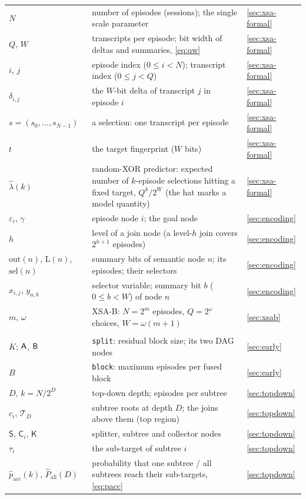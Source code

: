 \documentclass[11pt,a4paper]{article}
\newcommand{\XSAB}{\textsf{XSA-B}}
\newcommand{\dfam}[1]{\texttt{#1}}
\newcommand{\outb}{\mathrm{out}}
\newcommand{\selv}{\mathrm{sel}}
\newcommand{\lv}{\mathrm{L}}
\newcommand{\pacc}{\widehat{p}_{\mathrm{acc}}}
\newcommand{\Pall}{\widehat{P}_{\mathrm{all}}}
\newcommand{\nS}{\mathsf{S}}\newcommand{\nK}{\mathsf{K}}\newcommand{\nC}{\mathsf{C}}
\begin{document}
\begin{longtable}{@{}p{}p{}p{}@{}}
$N$ & number of episodes (sessions); the single scale parameter & \ref{sec:xsa-formal} \\
$Q$, $W$ & transcripts per episode; bit width of deltas and summaries, \eqref{eq:qw} & \ref{sec:xsa-formal} \\
$i$, $j$ & episode index ($0\le i<N$); transcript index ($0\le j<Q$) & \ref{sec:xsa-formal} \\
$\delta_{i,j}$ & the $W$-bit delta of transcript $j$ in episode $i$ & \ref{sec:xsa-formal} \\
$s=(s_0,\dots,s_{N-1})$ & a selection: one transcript per episode & \ref{sec:xsa-formal} \\
$t$ & the target fingerprint ($W$ bits) & \ref{sec:xsa-formal} \\
$\widehat{\lambda}(k)$ & random-XOR predictor: expected number of $k$-episode selections hitting a fixed target, $Q^k/2^W$ (the hat marks a model quantity) & \ref{sec:xsa-formal} \\
$\varepsilon_i$, $\gamma$ & episode node $i$; the goal node & \ref{sec:encoding} \\
$h$ & level of a join node (a level-$h$ join covers $2^{h+1}$ episodes) & \ref{sec:encoding} \\
$\outb(n)$, $\lv(n)$, $\selv(n)$ & summary bits of semantic node $n$; its episodes; their selectors & \ref{sec:encoding} \\
$x_{i,j}$, $y_{n,b}$ & selector variable; summary bit $b$ ($0\le b<W$) of node $n$ & \ref{sec:encoding} \\
$m$, $\omega$ & \XSAB{}: $N=2^m$ episodes, $Q=2^\omega$ choices, $W=\omega(m+1)$ & \ref{sec:xsab} \\
\addlinespace
\multicolumn{3}{@{}l}{\emph{Decompositions}}\\
$K$; $\mathsf{A}$, $\mathsf{B}$ & \dfam{split}: residual block size; its two DAG nodes & \ref{sec:early} \\
$B$ & \dfam{block}: maximum episodes per fused block & \ref{sec:early} \\
$D$, $k=N/2^D$ & top-down depth; episodes per subtree & \ref{sec:topdown} \\
$c_i$, $\mathcal{T}_D$ & subtree roots at depth $D$; the joins above them (top region) & \ref{sec:topdown} \\
$\nS$, $\nC_i$, $\nK$ & splitter, subtree and collector nodes & \ref{sec:topdown} \\
$\tau_i$ & the sub-target of subtree $i$ & \ref{sec:topdown} \\
$\pacc(k)$, $\Pall(D)$ & probability that one subtree / all subtrees reach their sub-targets, \eqref{eq:pacc} & \ref{sec:topdown} \\

\end{longtable}
\end{document}
